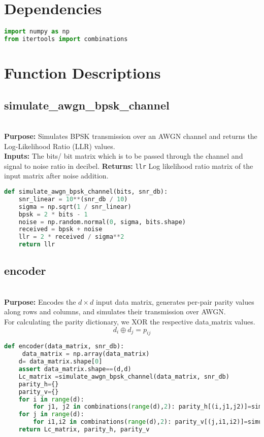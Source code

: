 \documentclass[12pt]{amsart}
\theoremstyle{plain}
\theoremstyle{definition}
\theoremstyle{remark}
\begin{document}
\section{Dependencies}

\begin{lstlisting}[language=Python]
import numpy as np
from itertools import combinations
\end{lstlisting}

\section{Function Descriptions}

\subsection{simulate\_awgn\_bpsk\_channel}\mbox{}\\

   \textbf{Purpose:} Simulates BPSK transmission over an AWGN channel and returns the Log-Likelihood Ratio (LLR) values. \\
   \textbf{Inputs:} The bits/ bit matrix which is to be passed through the channel and signal to noise ratio in decibel.
   \textbf{Returns:} \texttt{llr} Log likelihood ratio matrix of the input matrix after noise addition.



\begin{lstlisting}[language=Python]
def simulate_awgn_bpsk_channel(bits, snr_db):
    snr_linear = 10**(snr_db / 10)
    sigma = np.sqrt(1 / snr_linear)
    bpsk = 2 * bits - 1
    noise = np.random.normal(0, sigma, bits.shape)
    received = bpsk + noise
    llr = 2 * received / sigma**2
    return llr
\end{lstlisting}

\subsection{encoder}\mbox{}\\

\textbf{Purpose:} Encodes the $d \times d$ input data matrix, generates per-pair parity values along rows and columns, and simulates their transmission over AWGN.\\
For calculating the parity dictionary, we XOR the respective data$\_$matrix values.
\[
d_i \oplus d_j = p_{ij}
\]


\begin{lstlisting}[language=Python]
def encoder(data_matrix, snr_db):
     data_matrix = np.array(data_matrix)
    d= data_matrix.shape[0]
    assert data_matrix.shape==(d,d)
    Lc_matrix =simulate_awgn_bpsk_channel(data_matrix, snr_db)
    parity_h={}
    parity_v={}
    for i in range(d):
        for j1, j2 in combinations(range(d),2): parity_h[(i,j1,j2)]=simulate_awgn_bpsk_channel(np.array(data_matrix[i,j1]^data_matrix[i,j2]),snr_db)
    for j in range(d):
        for i1,i2 in combinations(range(d),2): parity_v[(j,i1,i2)]=simulate_awgn_bpsk_channel(np.array(data_matrix[i1,j]^data_matrix[i2,j]), snr_db)
    return Lc_matrix, parity_h, parity_v
\end{lstlisting}
\end{document}
